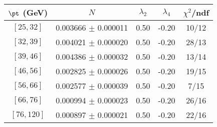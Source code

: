 \begin{tabular}{c||c|c|c|c}
$\pt$ (GeV) & $N$ & $\lambda_{2}$ & $\lambda_4$  & $\chi^2$/ndf  \\
\hline
$[25, 32]$ & 0.003666 $\pm$ 0.000011 & 0.50 & -0.20 & 10/12\\
$[32, 39]$ & 0.004021 $\pm$ 0.000020 & 0.50 & -0.20 & 28/13\\
$[39, 46]$ & 0.004386 $\pm$ 0.000032 & 0.50 & -0.20 & 13/14\\
$[46, 56]$ & 0.002825 $\pm$ 0.000026 & 0.50 & -0.20 & 19/15\\
$[56, 66]$ & 0.002577 $\pm$ 0.000039 & 0.50 & -0.20 & 7/15\\
$[66, 76]$ & 0.000994 $\pm$ 0.000023 & 0.50 & -0.20 & 26/16\\
$[76, 120]$ & 0.000897 $\pm$ 0.000021 & 0.50 & -0.20 & 22/16\\
\end{tabular}
